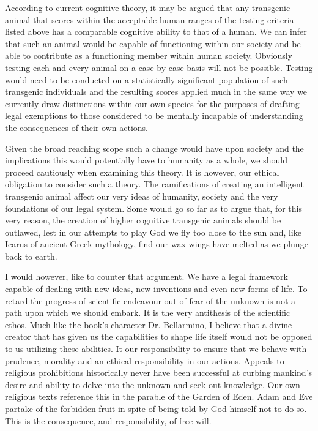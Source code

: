 \documentclass[letterpaper,10pt,twoside]{article}
\begin{document}
According to current cognitive theory, it may be argued that any transgenic animal that scores within the acceptable human ranges of the testing criteria listed above has a comparable cognitive ability to that of a human.  We can infer that such an animal would be capable of functioning within our society and be able to contribute as a functioning member within human society.  Obviously testing each and every animal on a case by case basis will not be possible.  Testing would need to be conducted on a statistically significant population of such transgenic individuals and the resulting scores applied much in the same way we currently draw distinctions within our own species for the purposes of drafting legal exemptions to those considered to be mentally incapable of understanding the consequences of their own actions.

Given the broad reaching scope such a change would have upon society and the implications this would potentially have to humanity as a whole, we should proceed cautiously when examining this theory.  It is however, our ethical obligation to consider such a theory.  The ramifications of creating an intelligent transgenic animal affect our very ideas of humanity, society and the very foundations of our legal system.  Some would go so far as to argue that, for this very reason, the creation of higher cognitive transgenic animals should be outlawed, lest in our attempts to play God we fly too close to the sun and, like Icarus of ancient Greek mythology, find our wax wings have melted as we plunge back to earth.

I would however, like to counter that argument.  We have a legal framework capable of dealing with new ideas, new inventions and even new forms of life.  To retard the progress of scientific endeavour out of fear of the unknown is not a path upon which we should embark.  It is the very antithesis of the scientific ethos.  Much like the book's character Dr. Bellarmino, I believe that a divine creator that has given us the capabilities to shape life itself would not be opposed to us utilizing these abilities.  It our responsibility to ensure that we behave with prudence, morality and an ethical responsibility in our actions.  Appeals to religious prohibitions historically never have been successful at curbing mankind's desire and ability to delve into the unknown and seek out knowledge.  Our own religious texts reference this in the parable of the Garden of Eden.  Adam and Eve partake of the forbidden fruit in spite of being told by God himself not to do so.  This is the consequence, and responsibility, of free will.
\end{document}
